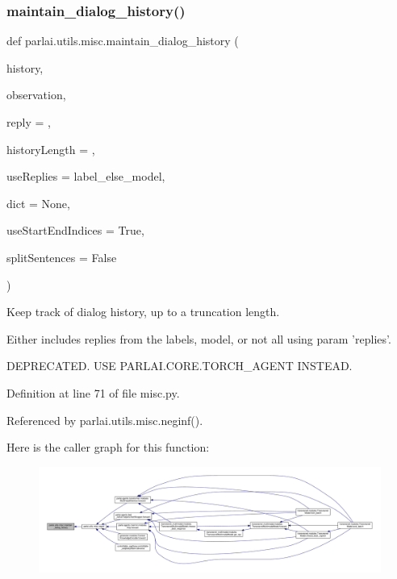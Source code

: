 \subsubsection{\texorpdfstring{maintain\+\_\+dialog\+\_\+history()}{maintain\_dialog\_history()}}
{\footnotesize\ttfamily def parlai.\+utils.\+misc.\+maintain\+\_\+dialog\+\_\+history (\begin{DoxyParamCaption}\item[{}]{history,  }\item[{}]{observation,  }\item[{}]{reply = {\ttfamily \textquotesingle{}\textquotesingle{}},  }\item[{}]{history\+Length = {},  }\item[{}]{use\+Replies = {\ttfamily \textquotesingle{}label\+\_\+else\+\_\+model\textquotesingle{}},  }\item[{}]{dict = {\ttfamily None},  }\item[{}]{use\+Start\+End\+Indices = {\ttfamily True},  }\item[{}]{split\+Sentences = {\ttfamily False} }\end{DoxyParamCaption})}

\begin{DoxyVerb}Keep track of dialog history, up to a truncation length.

Either includes replies from the labels, model, or not all using param
'replies'.

DEPRECATED. USE PARLAI.CORE.TORCH_AGENT INSTEAD.
\end{DoxyVerb}
 

Definition at line 71 of file misc.\+py.



Referenced by parlai.\+utils.\+misc.\+neginf().

Here is the caller graph for this function\+:
\nopagebreak
\begin{figure}[H]
\begin{center}
\leavevmode
\includegraphics[width=350pt]{namespaceparlai_1_1utils_1_1misc_ac8ca45e62ca906d9b6e5026588a5d2a2_icgraph}
\end{center}
\end{figure}
\mbox{\label{namespaceparlai_1_1utils_1_1misc_ae5db473b41d3b49814e2566e866282b6}} 
